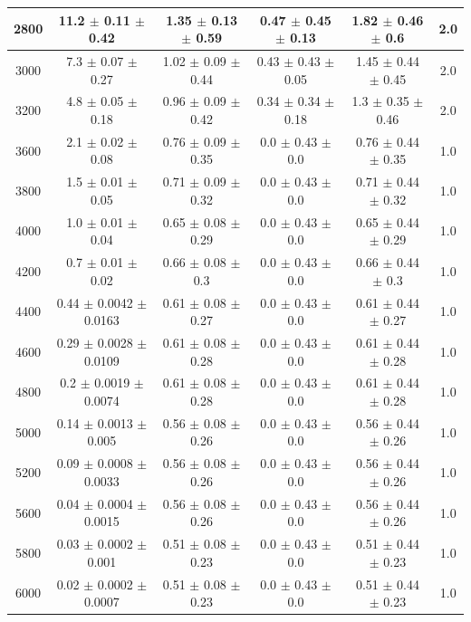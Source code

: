 \begin{table}[htp]
{\begin{tabular}{|c|c|c|c|c|c|}
			2800 & 11.2 $\pm$ 0.11 $\pm$ 0.42 & 1.35 $\pm$ 0.13 $\pm$ 0.59 & 0.47 $\pm$ 0.45 $\pm$ 0.13 & 1.82 $\pm$ 0.46 $\pm$ 0.6 & 2.0     \\ \hline
			3000 & 7.3 $\pm$ 0.07 $\pm$ 0.27 & 1.02 $\pm$ 0.09 $\pm$ 0.44 & 0.43 $\pm$ 0.43 $\pm$ 0.05 & 1.45 $\pm$ 0.44 $\pm$ 0.45 & 2.0     \\ \hline
			3200 & 4.8 $\pm$ 0.05 $\pm$ 0.18 & 0.96 $\pm$ 0.09 $\pm$ 0.42 & 0.34 $\pm$ 0.34 $\pm$ 0.18 & 1.3 $\pm$ 0.35 $\pm$ 0.46 & 2.0     \\ \hline
			3600 & 2.1 $\pm$ 0.02 $\pm$ 0.08 & 0.76 $\pm$ 0.09 $\pm$ 0.35 & 0.0 $\pm$ 0.43 $\pm$ 0.0 & 0.76 $\pm$ 0.44 $\pm$ 0.35 & 1.0     \\ \hline
			3800 & 1.5 $\pm$ 0.01 $\pm$ 0.05 & 0.71 $\pm$ 0.09 $\pm$ 0.32 & 0.0 $\pm$ 0.43 $\pm$ 0.0 & 0.71 $\pm$ 0.44 $\pm$ 0.32 & 1.0     \\ \hline
			4000 & 1.0 $\pm$ 0.01 $\pm$ 0.04 & 0.65 $\pm$ 0.08 $\pm$ 0.29 & 0.0 $\pm$ 0.43 $\pm$ 0.0 & 0.65 $\pm$ 0.44 $\pm$ 0.29 & 1.0     \\ \hline
			4200 & 0.7 $\pm$ 0.01 $\pm$ 0.02 & 0.66 $\pm$ 0.08 $\pm$ 0.3 & 0.0 $\pm$ 0.43 $\pm$ 0.0 & 0.66 $\pm$ 0.44 $\pm$ 0.3 & 1.0     \\ \hline
			4400 & 0.44 $\pm$ 0.0042 $\pm$ 0.0163 & 0.61 $\pm$ 0.08 $\pm$ 0.27 & 0.0 $\pm$ 0.43 $\pm$ 0.0 & 0.61 $\pm$ 0.44 $\pm$ 0.27 & 1.0     \\ \hline
			4600 & 0.29 $\pm$ 0.0028 $\pm$ 0.0109 & 0.61 $\pm$ 0.08 $\pm$ 0.28 & 0.0 $\pm$ 0.43 $\pm$ 0.0 & 0.61 $\pm$ 0.44 $\pm$ 0.28 & 1.0     \\ \hline
			4800 & 0.2 $\pm$ 0.0019 $\pm$ 0.0074 & 0.61 $\pm$ 0.08 $\pm$ 0.28 & 0.0 $\pm$ 0.43 $\pm$ 0.0 & 0.61 $\pm$ 0.44 $\pm$ 0.28 & 1.0     \\ \hline
			5000 & 0.14 $\pm$ 0.0013 $\pm$ 0.005 & 0.56 $\pm$ 0.08 $\pm$ 0.26 & 0.0 $\pm$ 0.43 $\pm$ 0.0 & 0.56 $\pm$ 0.44 $\pm$ 0.26 & 1.0     \\ \hline
			5200 & 0.09 $\pm$ 0.0008 $\pm$ 0.0033 & 0.56 $\pm$ 0.08 $\pm$ 0.26 & 0.0 $\pm$ 0.43 $\pm$ 0.0 & 0.56 $\pm$ 0.44 $\pm$ 0.26 & 1.0     \\ \hline
			5600 & 0.04 $\pm$ 0.0004 $\pm$ 0.0015 & 0.56 $\pm$ 0.08 $\pm$ 0.26 & 0.0 $\pm$ 0.43 $\pm$ 0.0 & 0.56 $\pm$ 0.44 $\pm$ 0.26 & 1.0     \\ \hline
			5800 & 0.03 $\pm$ 0.0002 $\pm$ 0.001 & 0.51 $\pm$ 0.08 $\pm$ 0.23 & 0.0 $\pm$ 0.43 $\pm$ 0.0 & 0.51 $\pm$ 0.44 $\pm$ 0.23 & 1.0     \\ \hline
			6000 & 0.02 $\pm$ 0.0002 $\pm$ 0.0007 & 0.51 $\pm$ 0.08 $\pm$ 0.23 & 0.0 $\pm$ 0.43 $\pm$ 0.0 & 0.51 $\pm$ 0.44 $\pm$ 0.23 & 1.0     \\ \hline

\end{tabular}}
\end{table}
